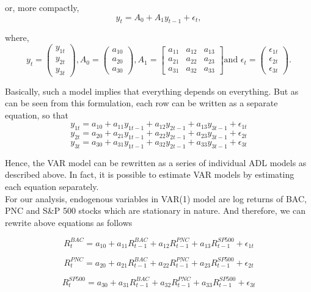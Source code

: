 \documentclass[a4paper, 11pt]{article}
\begin{document}
or, more compactly,
$$ y_t = A_0 + A_1 y_{t-1} + \epsilon_t,$$

where, $$y_t = \begin{pmatrix} y_{1t} \\ y_{2t} \\ y_{3t}\end{pmatrix}, A_0 = \begin{pmatrix} a_{10} \\ a_{20} \\ a_{30} \end{pmatrix}, A_1= \begin{bmatrix} a_{11} & a_{12} & a_{13} \\ a_{21} & a_{22} & a_{23} \\ a_{31} & a_{32} & a_{33}\end{bmatrix} \text{and   } \epsilon_t = \begin{pmatrix} \epsilon_{1t} \\ \epsilon_{2t} \\\epsilon_{3t} \end{pmatrix}.$$

Basically, such a model implies that everything depends on everything. But as can be seen from this formulation, each row can be written as a separate equation, so that 
$$ y_{1t} = a_{10} + a_{11} y_{1t-1} + a_{12} y_{2t-1} + a_{13} y_{3t-1} + \epsilon_{1t} $$
$$ y_{2t} = a_{20} + a_{21} y_{1t-1} + a_{22} y_{2t-1} + a_{23} y_{3t-1} + \epsilon_{2t} $$
$$ y_{3t} = a_{30} + a_{31} y_{1t-1} + a_{32} y_{2t-1} + a_{33} y_{3t-1} + \epsilon_{3t} $$

Hence, the VAR model can be rewritten as a series of individual ADL models as described above. In fact, it is possible to estimate VAR models by estimating each equation separately.\\

For our analysis, endogenous variables in VAR(1) model are log returns of BAC, PNC and S\&P 500 stocks which are stationary in nature. And therefore, we can rewrite above equations as follows

$$ R^{BAC}_{t} = a_{10} + a_{11} R^{BAC}_{t-1} + a_{12} R^{PNC}_{t-1} + a_{13} R^{SP500}_{t-1} + \epsilon_{1t} $$

$$ R^{PNC}_{t} = a_{20} + a_{21} R^{BAC}_{t-1} + a_{22} R^{PNC}_{t-1} + a_{23} R^{SP500}_{t-1} + \epsilon_{2t} $$

$$ R^{SP500}_{t} = a_{30} + a_{31} R^{BAC}_{t-1} + a_{32} R^{PNC}_{t-1} + a_{33} R^{SP500}_{t-1} + \epsilon_{3t} $$ \\
\end{document}
